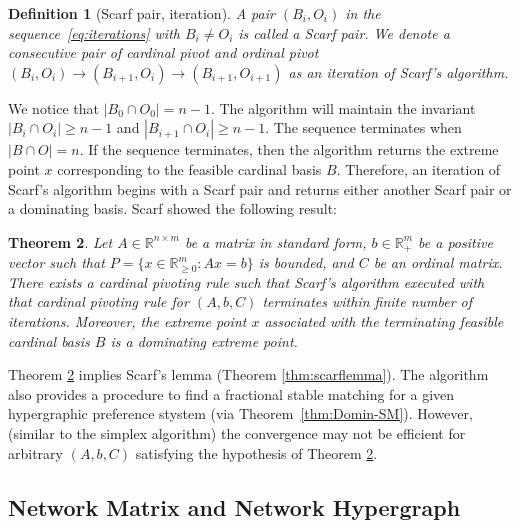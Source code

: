 \documentclass[11pt]{article}
\newcommand{\R}{\mathbb{R}}
\newtheorem{theorem}{Theorem}
\newtheorem{definition}[theorem]{Definition}
\begin{document}
\begin{definition}[Scarf pair, iteration]\label{def:Scarf-pair}
    A pair $(B_i,O_i)$ in the sequence~\eqref{eq:iterations} with $B_i\neq O_i$ is called a \emph{Scarf pair}. We denote a consecutive pair of cardinal pivot and ordinal pivot $(B_i,O_i)\to(B_{i+1},O_i)\to(B_{i+1},O_{i+1})$ as an \emph{iteration} of Scarf's algorithm.
\end{definition}

We notice that $|B_0\cap O_0|=n-1$. The algorithm will maintain the invariant $|B_i\cap O_i|\ge n-1$ and $|B_{i+1}\cap O_i|\ge n-1$. The sequence terminates when $|B\cap O|=n$. 
If the sequence terminates, then the algorithm returns the extreme point $x$ corresponding to the feasible cardinal basis $B$. 
Therefore, an iteration of Scarf's algorithm begins with a Scarf pair and returns either another Scarf pair or a dominating basis. Scarf showed the following result:

\begin{theorem}\cite{scarf1967core}\label{thm:constructive-scarf}
Let $A\in \R^{n\times m}$ be a matrix in standard form, $b\in \R^m_{+}$ be a positive vector such that $P=\{x\in \R^m_{\ge 0}: Ax = b\}$ is bounded, and $C$ be an ordinal matrix. There exists a cardinal pivoting rule such that Scarf's algorithm executed with that cardinal pivoting rule for $(A, b, C)$ terminates within finite number of iterations. Moreover, the extreme point $x$ associated with the terminating feasible cardinal basis $B$ is a dominating extreme point. 
\end{theorem}

Theorem \ref{thm:constructive-scarf} implies Scarf's lemma (Theorem \ref{thm:scarflemma}). 
The algorithm also provides a procedure to find a fractional stable matching for a given hypergraphic preference stystem (via  Theorem~\ref{thm:Domin-SM}). However, (similar to the simplex algorithm) the convergence may not be efficient for arbitrary $(A, b, C)$ satisfying the hypothesis of Theorem \ref{thm:constructive-scarf}. 

\subsection{Network Matrix and Network Hypergraph}\label{sec:pre-network}
\end{document}
